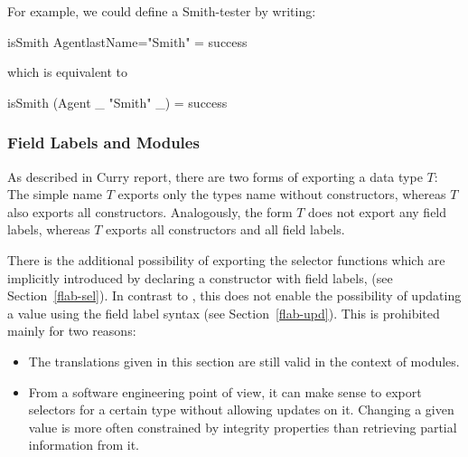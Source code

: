 
\noindent
For example, we could define a Smith-tester by writing:
\begin{curry}
isSmith Agent{lastName="Smith"} = success
\end{curry}
which is equivalent to
\begin{curry}
isSmith (Agent _ "Smith" _) = success
\end{curry}

\subsubsection{Field Labels and Modules}

As described in Curry report, there are two forms of
exporting a data type $T$: The simple name $T$ exports only the types name
without constructors, whereas $T$ also exports all
constructors. Analogously, the form $T$ does not export any field labels,
whereas $T$ exports all constructors and all field labels.

There is the additional possibility of exporting the selector functions which
are implicitly introduced by declaring a constructor with field labels,
(see Section~\ref{flab-sel}).
In contrast to \cite{PeytonJones03Haskell}, this does
not enable the possibility of updating a value using the field label syntax
(see Section~\ref{flab-upd}). This is prohibited mainly for two reasons:
\begin{itemize}
\item The translations given in this section are still valid in the context of modules.
\item From a software engineering point of view, it can make sense to
  export selectors for a certain type without allowing updates on it.
  Changing a given value is more often constrained by integrity
  properties than retrieving partial information from it.
\end{itemize}


